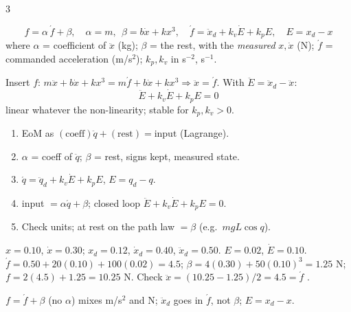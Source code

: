 \begin{multicols}{3}
\begin{fbx}
\[f=\alpha\,\acute f+\beta,\quad \alpha=m,\ \ \beta=b\dot x+kx^3,\quad \acute f=\ddot x_d+k_v\dot E+k_pE,\quad E=x_d-x\]
where $\alpha$ = coefficient of $\ddot x$ (kg); $\beta$ = the rest, with the \emph{measured} $x,\dot x$ (N); $\acute f$ = commanded acceleration (m/s$^2$); $k_p,k_v$ in s$^{-2}$, s$^{-1}$.
\end{fbx}
\begin{deriv}
Insert $f$: $m\ddot x+b\dot x+kx^3=m\acute f+b\dot x+kx^3\Rightarrow\ddot x=\acute f$. With $\ddot E=\ddot x_d-\ddot x$:
\[\boxed{\ddot E+k_v\dot E+k_pE=0}\]
linear whatever the non-linearity; stable for $k_p,k_v>0$.
\end{deriv}
\begin{recipe}\label{w9:rec}
\begin{enumerate}
\item EoM as $(\text{coeff})\ddot q+(\text{rest})=\text{input}$ (Lagrange).
\item $\alpha$ = coeff of $\ddot q$; $\beta$ = rest, signs kept, measured state.
\item $\acute q=\ddot q_d+k_v\dot E+k_pE$, $E=q_d-q$.
\item input $=\alpha\acute q+\beta$; closed loop $\ddot E+k_v\dot E+k_pE=0$.
\item Check units; at rest on the path law $=\beta$ (e.g.\ $mgL\cos q$).
\end{enumerate}
\end{recipe}
\begin{worked}[cubic spring; $m=2$, $b=4$, $k=50$, $k_p=100$, $k_v=20$]
$x=0.10$, $\dot x=0.30$; $x_d=0.12$, $\dot x_d=0.40$, $\ddot x_d=0.50$. $E=0.02$, $\dot E=0.10$. $\acute f=0.50+20(0.10)+100(0.02)=4.5$; $\beta=4(0.30)+50(0.10)^3=1.25$ N; $f=2(4.5)+1.25=10.25$ N. Check $\ddot x=(10.25-1.25)/2=4.5=\acute f$ \checkmark. \chk
\end{worked}
\begin{trap}
$f=\acute f+\beta$ (no $\alpha$) mixes m/s$^2$ and N; $\ddot x_d$ goes in $\acute f$, not $\beta$; $E=x_d-x$.
\end{trap}
\begin{wnfig}
\wnAqfalse
\def\wnDD{\ddot x_d}\def\wnD{\dot x_d}\def\wnR{x_d}\def\wnKp{k_p}\def\wnKv{k_v}\def\wnAl{m}\def\wnBe{b\dot x+kx^3}\def\wnPl{m\ddot x{+}b\dot x{+}kx^3{=}f}\def\wnU{f}\def\wnP{x}\def\wnV{\dot x}\def\wnE{E}\def\wnEd{\dot E}\def\wnFp{\acute f}
\resizebox{\linewidth}{!}{\wnloop}\par
{}
\end{wnfig}


\end{multicols}
